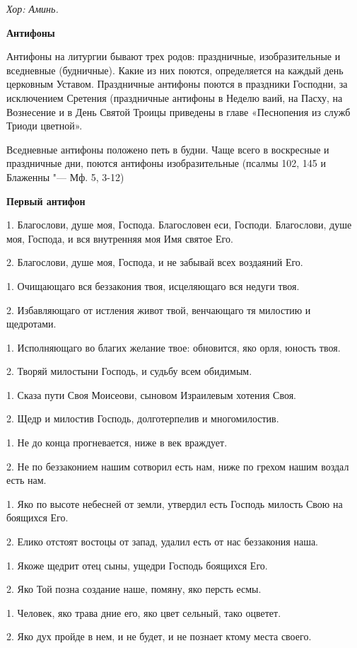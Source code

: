 \itshape Хор:\normalfont{} Аминь.


\medskip
\bfseries Антифоны\normalfont{}


Антифоны на литургии бывают трех родов: праздничные, изобразительные и вседневные (будничные). Какие из них поются, определяется на каждый день церковным Уставом. Праздничные антифоны поются в праздники Господни, за исключением Сретения (праздничные антифоны в Неделю ваий, на Пасху, на Вознесение и в День Святой Троицы приведены в главе «Песнопения из служб Триоди цветной».


Вседневные антифоны положено петь в будни. Чаще всего в воскресные и праздничные дни, поются антифоны изобразительные (псалмы 102, 145 и Блаженны "--- Мф. 5, 3-12)


\medskip
\bfseries Первый антифон \normalfont{}


1. Благослови, душе моя, Господа. Благословен еси, Господи. Благослови, душе моя, Господа, и вся внутренняя моя Имя святое Его. 


2. Благослови, душе моя, Господа, и не забывай всех воздаяний Его. 


1. Очищающаго вся беззакония твоя,  исцеляющаго вся недуги твоя. 


2. Избавляющаго от истления живот твой,  венчающаго тя милостию и щедротами. 


1. Исполняющаго во благих желание твое:  обновится, яко орля, юность твоя. 


2. Творяй милостыни Господь, и судьбу всем обидимым. 


1. Сказа пути Своя Моисеови, сыновом Израилевым хотения Своя. 


2. Щедр и милостив Господь, долготерпелив и многомилостив.


1. Не до конца прогневается, ниже в век враждует. 


2. Не по беззаконием нашим сотворил есть нам, ниже по грехом нашим воздал есть нам. 


1. Яко по высоте небесней от земли,  утвердил есть Господь милость Свою на боящихся Его. 


2. Елико отстоят востоцы от запад,  удалил есть от нас беззакония наша. 


1. Якоже щедрит отец сыны, ущедри Господь боящихся Его. 


2. Яко Той позна создание наше, помяну, яко персть есмы. 


1. Человек, яко трава дние его, яко цвет сельный, тако оцветет. 


2. Яко дух пройде в нем, и не будет, и не познает ктому места своего. 


